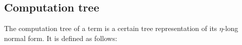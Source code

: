 %



\subsection{Computation tree}
The computation tree of a term is a certain tree representation of its
$\eta$-long normal form. It is defined as follows:

